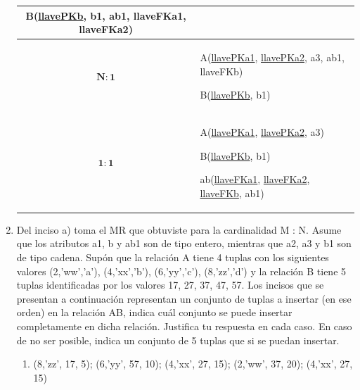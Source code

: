 \begin{enumerate}[label=\textbf{\alph*.}]
\begin{table}[h!]
\begin{tabular}{|c|p{12cm}|}
                                B(\underline{llavePKb},
                                  b1,
                                  ab1,
                                  llaveFKa1,
                                  llaveFKa2)\\
            \hline
            $\mathbf{N : 1}$ &  A(\underline{llavePKa1},
                                  \underline{llavePKa2},
                                  a3,
                                  ab1,
                                  llaveFKb)
                                  
                                B(\underline{llavePKb},
                                  b1)\\
            \hline
            $\mathbf{1 : 1}$ &  A(\underline{llavePKa1},
                                  \underline{llavePKa2}, 
                                  a3)
                                  
                                B(\underline{llavePKb},
                                  b1)

                                ab(\underline{llaveFKa1},
                                   \underline{llaveFKa2},
                                   \underline{llaveFKb},
                                   ab1)\\
            \hline
        \end{tabular}
    \end{table}
    \vspace{0.5cm}
    \newpage

    \item Del inciso a) toma el MR que obtuviste para la cardinalidad M : N. Asume que los atributos a1, b y ab1 son de tipo entero, mientras que a2, a3 y b1 son de tipo cadena. Supón que la relación A tiene 4 tuplas con los siguientes valores (2,'ww','a'), (4,'xx','b'), (6,'yy','c'), (8,'zz','d') y la relación B tiene 5 tuplas identificadas por los valores 17, 27, 37, 47, 57. Los incisos que se presentan a continuación representan un conjunto de tuplas a insertar (en ese orden) en la relación AB, indica cuál conjunto se puede insertar completamente en dicha relación. Justifica tu respuesta en cada caso. En caso de no ser posible, indica un conjunto de 5 tuplas que si se puedan insertar.

\begin{enumerate}[label=\roman*.]
    \item (8,'zz', 17, 5); (6,'yy', 57, 10); (4,'xx', 27, 15); (2,'ww', 37, 20); (4,'xx', 27, 15)
    

\end{enumerate}
\end{enumerate}
